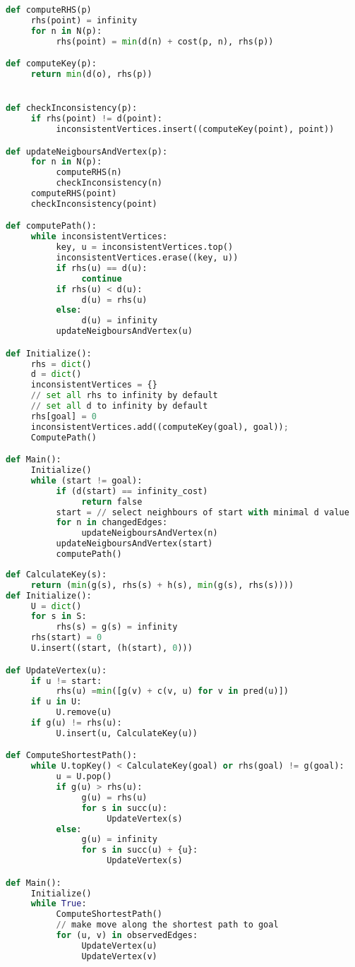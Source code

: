 \documentclass[11pt]{article}
\begin{document}
\begin{lstlisting}[language=Python, caption=SWSFP]
def computeRHS(p)
     rhs(point) = infinity
     for n in N(p):
          rhs(point) = min(d(n) + cost(p, n), rhs(p))

def computeKey(p):
     return min(d(o), rhs(p))


def checkInconsistency(p):
     if rhs(point) != d(point):
          inconsistentVertices.insert((computeKey(point), point))

def updateNeigboursAndVertex(p):
     for n in N(p):
          computeRHS(n)
          checkInconsistency(n)
     computeRHS(point)
     checkInconsistency(point)

def computePath():
     while inconsistentVertices:
          key, u = inconsistentVertices.top()
          inconsistentVertices.erase((key, u))
          if rhs(u) == d(u):
               continue
          if rhs(u) < d(u):
               d(u) = rhs(u)
          else:
               d(u) = infinity
          updateNeigboursAndVertex(u)

def Initialize():
     rhs = dict()
     d = dict()
     inconsistentVertices = {}
     // set all rhs to infinity by default
     // set all d to infinity by default
     rhs[goal] = 0
     inconsistentVertices.add((computeKey(goal), goal));
     ComputePath()

def Main():
     Initialize()
     while (start != goal):
          if (d(start) == infinity_cost)
               return false
          start = // select neighbours of start with minimal d value
          for n in changedEdges:
               updateNeigboursAndVertex(n)
          updateNeigboursAndVertex(start)
          computePath()
\end{lstlisting}


\begin{lstlisting}[language=Python, caption=D* lite ]
def CalculateKey(s):
     return (min(g(s), rhs(s) + h(s), min(g(s), rhs(s))))
def Initialize():
     U = dict()
     for s in S:
          rhs(s) = g(s) = infinity
     rhs(start) = 0
     U.insert((start, (h(start), 0)))

def UpdateVertex(u):
     if u != start:
          rhs(u) =min([g(v) + c(v, u) for v in pred(u)])
     if u in U:
          U.remove(u)
     if g(u) != rhs(u):
          U.insert(u, CalculateKey(u))

def ComputeShortestPath():
     while U.topKey() < CalculateKey(goal) or rhs(goal) != g(goal):
          u = U.pop()
          if g(u) > rhs(u):
               g(u) = rhs(u)
               for s in succ(u):
                    UpdateVertex(s)
          else:
               g(u) = infinity
               for s in succ(u) + {u}:
                    UpdateVertex(s)

def Main():
     Initialize()
     while True:
          ComputeShortestPath()
          // make move along the shortest path to goal
          for (u, v) in observedEdges:
               UpdateVertex(u)
               UpdateVertex(v)
\end{lstlisting}
\end{document}
